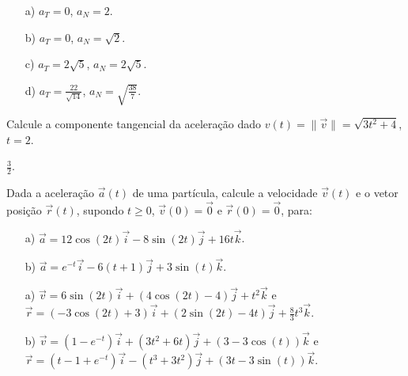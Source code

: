 \begin{resp}
\begin{itemize}
 \item[a)] $a_T=0$, $a_N=2$.
 \item[b)] $a_T=0$, $a_N=\sqrt{2}$.
 \item[c)] $a_T=2\sqrt{5}$, $a_N=2\sqrt{5}$.
 \item[d)] $a_T=\frac{22}{\sqrt{14}}$, $a_N=\sqrt{\frac{38}{7}}$.
\end{itemize}

\end{resp}
\begin{exer} Calcule a componente tangencial da aceleração dado $v(t) = \|\vec{v}\| = \sqrt{3t^2+4}$, $t=2$.
\end{exer}
\begin{resp}
 $\frac{3}{2}$.
\end{resp}


\begin{exer} Dada a aceleração $\vec{a}(t)$ de uma partícula, calcule a velocidade $\vec{v}(t)$ e o vetor posição $\vec{r}(t)$, supondo $t\geq 0$, $\vec{v}(0)=\vec{0}$ e  $\vec{r}(0)=\vec{0}$, para:
\begin{itemize}
 \item[a)] $\vec{a}=12\cos(2t)\vec{i}-8\sin(2t)\vec{j}+16t\vec{k}$.
 \item[b)] $\vec{a}=e^{-t}\vec{i}-6(t+1)\vec{j}+3\sin(t)\vec{k}$.
\end{itemize}
\end{exer}
\begin{resp}
\begin{itemize}
 \item[a)] $\vec{v}=6\sin(2t)\vec{i}+(4\cos(2t)-4)\vec{j}+t^2\vec{k}$ e $\vec{r}=(-3\cos(2t)+3)\vec{i}+(2\sin(2t)-4t)\vec{j}+\frac{8}{3}t^3\vec{k}$.
  \item[b)] $\vec{v}=(1-e^{-t})\vec{i}+(3t^2+6t)\vec{j}+(3-3\cos(t))\vec{k}$ e $\vec{r}=(t-1+e^{-t})\vec{i}-(t^3+3t^2)\vec{j}+(3t-3\sin(t))\vec{k}$.
\end{itemize}
\end{resp}



